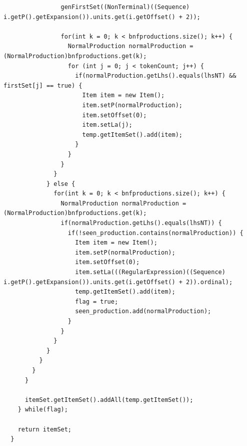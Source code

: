 \documentclass[oneside]{book}
\begin{document}
\begin{lstlisting}
                genFirstSet((NonTerminal)((Sequence) i.getP().getExpansion()).units.get(i.getOffset() + 2));
              
                for(int k = 0; k < bnfproductions.size(); k++) {
                  NormalProduction normalProduction = (NormalProduction)bnfproductions.get(k);
                  for (int j = 0; j < tokenCount; j++) {
                    if(normalProduction.getLhs().equals(lhsNT) && firstSet[j] == true) {
                      Item item = new Item();
                      item.setP(normalProduction);
                      item.setOffset(0);
                      item.setLa(j);
                      temp.getItemSet().add(item);
                    }
                  }
                }
              }
            } else {
              for(int k = 0; k < bnfproductions.size(); k++) {
                NormalProduction normalProduction = (NormalProduction)bnfproductions.get(k);
                if(normalProduction.getLhs().equals(lhsNT)) {
                  if(!seen_production.contains(normalProduction)) {                
                    Item item = new Item();
                    item.setP(normalProduction);
                    item.setOffset(0);
                    item.setLa(((RegularExpression)((Sequence) i.getP().getExpansion()).units.get(i.getOffset() + 2)).ordinal);
                    temp.getItemSet().add(item);
                    flag = true;
                    seen_production.add(normalProduction);
                  }
                }
              }
            }
          }
        }
      }
      
      itemSet.getItemSet().addAll(temp.getItemSet());
    } while(flag);
    
    return itemSet;
  }
\end{lstlisting}
\end{document}
